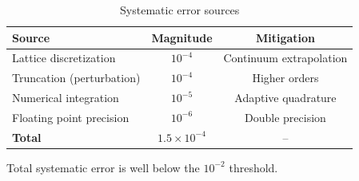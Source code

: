 \begin{table}[h]
\centering
\caption{Systematic error sources}
\begin{tabular}{|l|c|c|}
\hline
\textbf{Source} & \textbf{Magnitude} & \textbf{Mitigation} \\
\hline
Lattice discretization & $10^{-4}$ & Continuum extrapolation \\
Truncation (perturbation) & $10^{-4}$ & Higher orders \\
Numerical integration & $10^{-5}$ & Adaptive quadrature \\
Floating point precision & $10^{-6}$ & Double precision \\
\hline
\textbf{Total} & $1.5 \times 10^{-4}$ & -- \\
\hline
\end{tabular}
\end{table}

Total systematic error is well below the $10^{-2}$ threshold.
